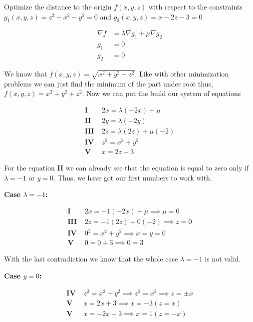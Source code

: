 Optimize the distance to the origin \(f(x,y,z)\) with respect to the constraints 
\(g_1(x,y,z) = z^2 - x^2 - y^2 = 0\) and \(g_2(x,y,z) = x - 2z - 3 = 0\)

\begin{align*}
    \nabla f &= \lambda \nabla g_1 + \mu \nabla g_2 \\
    g_1 &= 0 \\
    g_2 &= 0 
\end{align*}

We know that \(f(x,y,z) = \sqrt{x^2 + y^2 + z^2}\). Like with other minimization problems we can 
just find the minimum of the part under root thus, \(f(x,y,z) = x^2 + y^2 + z^2\). Now we can put 
the build our system of equations

\begin{align*}
    \textbf{I   } &2x = \lambda(-2x) + \mu \\
    \textbf{II  } &2y = \lambda(-2y) \\
    \textbf{III } &2z = \lambda(2z) + \mu(-2) \\
    \textbf{IV  } &z^2 = x^2 + y^2 \\
    \textbf{V   } &x = 2z + 3   
\end{align*}

For the equation \textbf{II} we can already see that the equation is equal to zero only if 
\(\lambda = -1\) or \(y = 0\). Thus, we have got our first numbers to work with.

\textbf{Case \(\lambda = -1\):}

\begin{align*}
    \textbf{I   } &2x = -1(-2x) + \mu  \implies \mu = 0\\
    \textbf{III } &2z = -1(2z) + 0(-2) \implies z = 0 \\
    \textbf{IV  } &0^2 = x^2 + y^2  \implies x = y = 0\\
    \textbf{V   } &0 = 0 + 3 \implies 0 = 3   
\end{align*}

With the last contradiction we know that the whole case \(\lambda = -1\) is not valid.

\textbf{Case \(y = 0\):}

\begin{align*}
    \textbf{IV  } &z^2 = x^2 + y^2 \implies z^2 = x^2  \implies z = \pm x\\
    \textbf{V   } &x = 2x + 3  \implies x = -3 (z = x)\\ 
    \textbf{V   } &x = -2x + 3  \implies x = 1 (z = -x)\\ 
\end{align*}

